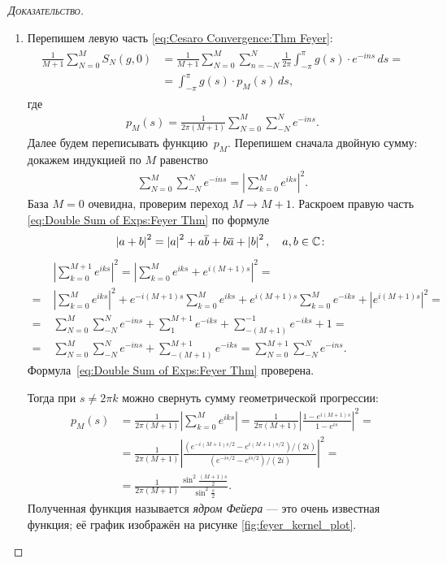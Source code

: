 \documentclass[../complex-analysis.tex]{subfiles}
\begin{document}
\begin{proof}[\normalfont\textsc{Доказательство}]
\begin{enumerate}
  \item Перепишем левую часть \eqref{eq:Cesaro Convergence:Thm Feyer}:
   \begin{align}
    \begin{aligned}
     \label{eq:LHS Rewritten in p_M:Feyer Thm}
     \frac{1}{M+1} \sum_{N=0}^{M} S_N(g,0) &= \frac{1}{M+1} \sum_{N=0}^{M} \sum_{n=-N}^{N} \frac{1}{2\pi} \int_{-\pi}^{\pi} g(s) \cdot e^{-ins}\,ds = \\
     &= \int_{-\pi}^{\pi} g(s) \cdot p_M(s)\,ds,
    \end{aligned}
   \end{align} где
   \begin{align}
    \label{eq:Defintion of p_M:Feyer Thm}
    p_M(s) = \frac{1}{2\pi(M+1)} \sum_{N=0}^{M} \sum_{-N}^{N} e^{-ins}.
   \end{align} Далее будем переписывать функцию~$ p_M $. Перепишем сначала двойную сумму: докажем индукцией по $ M $ равенство
   \begin{align}
    \label{eq:Double Sum of Exps:Feyer Thm}
    \sum_{N=0}^{M} \sum_{-N}^{N} e^{-ins} = \left| \sum_{k=0}^{M} e^{iks} \right|^{2}.
   \end{align} База $ M=0 $ очевидна, проверим переход $ M \to M+1 $. Раскроем правую часть \eqref{eq:Double Sum of Exps:Feyer Thm} по формуле
   \begin{align*}
    \left| a+b \right|^{2} = \left| a \right|^{2} +  a \overline b + b \overline a + \left| b \right|^{2}, \quad a,b\in\mathbb{C}\colon
   \end{align*}
   \begin{align*}
    &\left| \sum_{k=0}^{M+1} e^{iks} \right|^{2} = \left| \sum_{k=0}^{M}e^{iks} + e^{i(M+1)s} \right|^{2} =  \\
    =\;&\left| \sum_{k=0}^{M} e^{iks} \right|^{2} + e^{-i(M+1)s} \sum_{k=0}^{M} e^{iks} + e^{i(M+1)s} \sum_{k=0}^{M} e^{-iks} + \left| e^{i(M+1)s} \right|^{2} = \\
    =\;& \sum_{N=0}^{M} \sum_{-N}^{N} e^{-ins} + \sum_{1}^{M+1} e^{-iks} + \sum_{-(M+1)}^{-1} e^{-iks} + 1 = \\
    =\;& \sum_{N=0}^{M} \sum_{-N}^{N} e^{-ins} + \sum_{-(M+1)}^{M+1} e^{-iks} = \sum_{N=0}^{M+1} \sum_{-N}^{N} e^{-ins}.
   \end{align*} Формула~\eqref{eq:Double Sum of Exps:Feyer Thm} проверена.

   Тогда при $ s \neq 2\pi k $ можно свернуть сумму геометрической прогрессии:
   \begin{align*}
    p_M(s) &= \frac{1}{2\pi(M+1)} \left| \sum_{k=0}^{M} e^{iks} \right| = \frac{1}{2 \pi (M+1)} \left| \frac{1-e^{i(M+1)s}}{1-e^{is}} \right|^{2} = \\
    &= \frac{1}{2 \pi (M+1)}  \left|\frac{(e^{-i(M+1)s / 2} - e^{i(M+1)s / 2})/(2i)}{(e^{-is / 2} - e^{is / 2}) / (2i)} \right|^{2} = \\
    &= \frac{1}{2 \pi (M+1)} \frac{ \sin^{2} \frac{(M+1)s}{2}}{\sin^{2} \frac{s}{2}}.
   \end{align*} Полученная функция называется \emph{ядром Фейера} --- это очень известная функция; её график изображён на рисунке \ref{fig:feyer_kernel_plot}.


\end{enumerate}
\end{proof}
\end{document}
